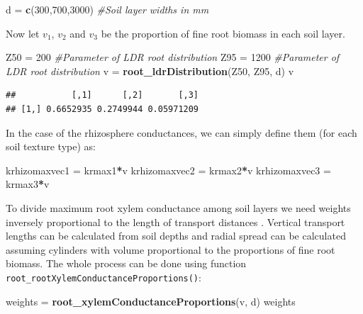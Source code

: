 \documentclass[]{book}
\newenvironment{Shaded}{\begin{snugshade}}{\end{snugshade}}
\newcommand{\KeywordTok}[1]{\textcolor[rgb]{0.13,0.29,0.53}{\textbf{#1}}}
\newcommand{\DecValTok}[1]{\textcolor[rgb]{0.00,0.00,0.81}{#1}}
\newcommand{\StringTok}[1]{\textcolor[rgb]{0.31,0.60,0.02}{#1}}
\newcommand{\CommentTok}[1]{\textcolor[rgb]{0.56,0.35,0.01}{\textit{#1}}}
\newcommand{\OperatorTok}[1]{\textcolor[rgb]{0.81,0.36,0.00}{\textbf{#1}}}
\newcommand{\NormalTok}[1]{#1}
\begin{document}
\begin{Shaded}
\begin{Highlighting}[]
\NormalTok{d =}\StringTok{ }\KeywordTok{c}\NormalTok{(}\DecValTok{300}\NormalTok{,}\DecValTok{700}\NormalTok{,}\DecValTok{3000}\NormalTok{) }\CommentTok{#Soil layer widths in mm}
\end{Highlighting}
\end{Shaded}

Now let \(v_1\), \(v_2\) and \(v_3\) be the proportion of fine root
biomass in each soil layer.

\begin{Shaded}
\begin{Highlighting}[]
\NormalTok{Z50 =}\StringTok{ }\DecValTok{200} \CommentTok{#Parameter of LDR root distribution}
\NormalTok{Z95 =}\StringTok{ }\DecValTok{1200} \CommentTok{#Parameter of LDR root distribution}
\NormalTok{v =}\StringTok{ }\KeywordTok{root_ldrDistribution}\NormalTok{(Z50, Z95, d)}
\NormalTok{v}
\end{Highlighting}
\end{Shaded}

\begin{verbatim}
##           [,1]      [,2]       [,3]
## [1,] 0.6652935 0.2749944 0.05971209
\end{verbatim}

In the case of the rhizosphere conductances, we can simply define them
(for each soil texture type) as:

\begin{Shaded}
\begin{Highlighting}[]
\NormalTok{krhizomaxvec1 =}\StringTok{ }\NormalTok{krmax1}\OperatorTok{*}\NormalTok{v}
\NormalTok{krhizomaxvec2 =}\StringTok{ }\NormalTok{krmax2}\OperatorTok{*}\NormalTok{v}
\NormalTok{krhizomaxvec3 =}\StringTok{ }\NormalTok{krmax3}\OperatorTok{*}\NormalTok{v}
\end{Highlighting}
\end{Shaded}

To divide maximum root xylem conductance among soil layers we need
weights inversely proportional to the length of transport distances
\citep{Sperry2016a}. Vertical transport lengths can be calculated from
soil depths and radial spread can be calculated assuming cylinders with
volume proportional to the proportions of fine root biomass. The whole
process can be done using function
\texttt{root\_rootXylemConductanceProportions()}:

\begin{Shaded}
\begin{Highlighting}[]
\NormalTok{weights =}\StringTok{ }\KeywordTok{root_xylemConductanceProportions}\NormalTok{(v, d)}
\NormalTok{weights}
\end{Highlighting}
\end{Shaded}
\end{document}
